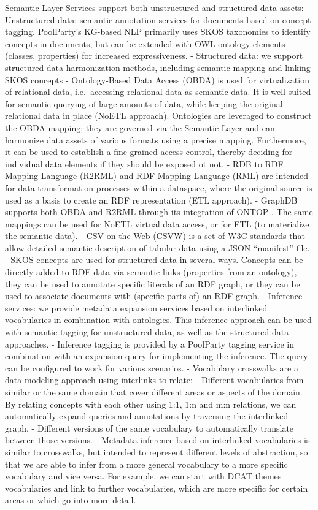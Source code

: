 \documentclass[manuscript,screen]{acmart}
\begin{document}
Semantic Layer Services support both unstructured and structured data
assets: - Unstructured data: semantic annotation services for documents
based on concept tagging. PoolParty's KG-based NLP primarily uses SKOS
taxonomies to identify concepts in documents, but can be extended with
OWL ontology elements (classes, properties) for increased
expressiveness. - Structured data: we support structured data
harmonization methods, including semantic mapping and linking SKOS
concepts - Ontology-Based Data Access (OBDA) is used for virtualization
of relational data, i.e.~accessing relational data as semantic data. It
is well suited for semantic querying of large amounts of data, while
keeping the original relational data in place (NoETL approach).
Ontologies are leveraged to construct the OBDA mapping; they are
governed via the Semantic Layer and can harmonize data assets of various
formats using a precise mapping. Furthermore, it can be used to
establish a fine-grained access control, thereby deciding for individual
data elements if they should be exposed ot not. - RDB to RDF Mapping
Language (R2RML) \citep{souripriyadasR2RMLRDBRDF2012} and RDF Mapping
Language (RML) \citep{RMLIntroduction2024} are intended for data
transformation processes within a dataspace, where the original source
is used as a basis to create an RDF representation (ETL approach). -
GraphDB supports both OBDA and R2RML through its integration of ONTOP
\citep{bagosiOntopFrameworkOntology2014}. The same mappings can be used
for NoETL virtual data access, or for ETL (to materialize the semantic
data). - CSV on the Web (CSVW) \citep{swirrlCSVWStandards2024} is a set
of W3C standards that allow detailed semantic description of tabular
data using a JSON ``manifest'' file. - SKOS concepts are used for
structured data in several ways. Concepts can be directly added to RDF
data via semantic links (properties from an ontology), they can be used
to annotate specific literals of an RDF graph, or they can be used to
associate documents with (specific parts of) an RDF graph. - Inference
services: we provide metadata expansion services based on interlinked
vocabularies in combination with ontologies. This inference approach can
be used with semantic tagging for unstructured data, as well as the
structured data approaches. - Inference tagging is provided by a
PoolParty tagging service in combination with an expansion query for
implementing the inference. The query can be configured to work for
various scenarios. - Vocabulary crosswalks are a data modeling approach
using interlinks to relate: - Different vocabularies from similar or the
same domain that cover different areas or aspects of the domain. By
relating concepts with each other using 1:1, 1:n and m:n relations, we
can automatically expand queries and annotations by traversing the
interlinked graph. - Different versions of the same vocabulary to
automatically translate between those versions. - Metadata inference
based on interlinked vocabularies is similar to crosswalks, but intended
to represent different levels of abstraction, so that we are able to
infer from a more general vocabulary to a more specific vocabulary and
vice versa. For example, we can start with DCAT themes vocabularies and
link to further vocabularies, which are more specific for certain areas
or which go into more detail.
\end{document}
